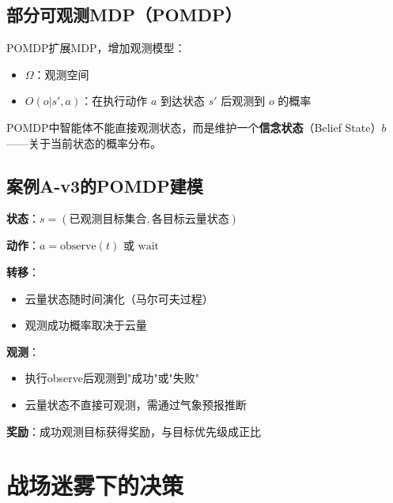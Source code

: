 \subsection{部分可观测MDP（POMDP）}

\begin{definition}[POMDP]
POMDP扩展MDP，增加观测模型：
\begin{itemize}
  \item $\Omega$：观测空间
  \item $O(o|s',a)$：在执行动作 $a$ 到达状态 $s'$ 后观测到 $o$ 的概率
\end{itemize}
\end{definition}

POMDP中智能体不能直接观测状态，而是维护一个\textbf{信念状态}（Belief State）$b$——关于当前状态的概率分布。

\subsection{案例A-v3的POMDP建模}

\begin{example}[云层遮挡的POMDP模型]
\textbf{状态}：$s = (\text{已观测目标集合}, \text{各目标云量状态})$

\textbf{动作}：$a = \text{observe}(t)$ 或 $\text{wait}$

\textbf{转移}：
\begin{itemize}
  \item 云量状态随时间演化（马尔可夫过程）
  \item 观测成功概率取决于云量
\end{itemize}

\textbf{观测}：
\begin{itemize}
  \item 执行observe后观测到"成功"或"失败"
  \item 云量状态不直接可观测，需通过气象预报推断
\end{itemize}

\textbf{奖励}：成功观测目标获得奖励，与目标优先级成正比
\end{example}

\section{战场迷雾下的决策}


